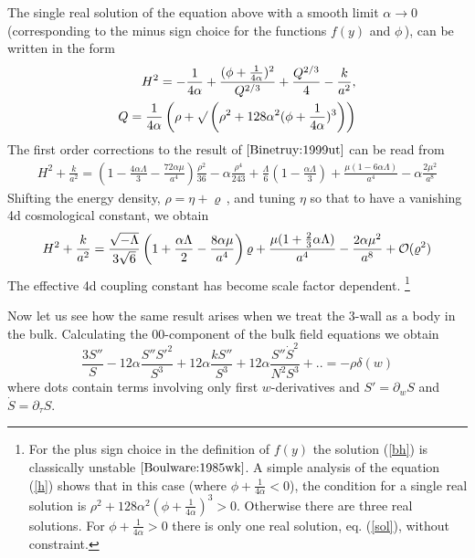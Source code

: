\documentclass[a4paper,a4paper]{article}
\begin{document}
The single real solution of the equation above 
with a smooth limit $\alpha \to 0$
(corresponding to
the minus sign choice for the functions $f(y)$ and $\phi$\,),
can be written in the form
\begin{eqnarray} \label{sol}
H^2= -\frac{1}{4 \alpha} + \frac{(\phi+ \frac{1}{4 \alpha})^2}{Q^{2/3}}+ \frac{Q^{2/3}}{4}-\frac{k}{a^2}, \\
Q=\frac{1}{4 \alpha} \left( \rho+ \surd \left( \rho^2+ 128 \alpha^2 (\phi+ 
\frac{1}{4 \alpha} )^3 \right) \right) \nonumber
\end{eqnarray}
The first order corrections to the result of $\cite{Binetruy:1999ut}$ can be read from
\begin{eqnarray}
H^2+\frac{k}{a^2}=\left(1-\frac{4\alpha\Lambda}{3}-\frac{72\alpha\mu}{a^4} \right) \frac{\rho^2}{36}
-\alpha \frac{\rho^4}{243}
+\frac{\Lambda}{6} \left(1-\frac{\alpha\Lambda}{3} \right) 
+ \frac{\mu(1-6\alpha\Lambda)}{a^4}-\alpha \frac{2\mu^2}{a^8}
\end{eqnarray}
Shifting the energy density, $\rho=\eta+\varrho\,$,  and tuning $\eta$ so that to have 
a vanishing 4d cosmological constant, we obtain
\begin{equation}
H^2+\frac{k}{a^2}=\frac{\sqrt{-\Lambda}}{3 \sqrt{6}} 
\left(1+  \frac{\alpha\Lambda}{2}-\frac{8\alpha \mu}{a^4} \right) \varrho+
\frac{\mu(1+\frac{2}{3} \alpha \Lambda)}{a^4}-\frac{2\alpha\mu^2}{a^8} 
+ {\cal O}(\varrho^2)
\end{equation}
The effective 4d coupling constant has become scale factor dependent.
\footnote{For the plus sign choice in the definition of $f(y)$ the solution (\ref{bh})
is classically unstable $\cite{Boulware:1985wk}$. A simple analysis of the equation (\ref{h})
shows that in this case (where $\phi+ \frac{1}{4\alpha}<0$), the condition for a single real
solution is $\rho^2+ 128 \alpha^2 (\phi+ 
\frac{1}{4 \alpha} )^3>0$. Otherwise there are three real solutions.
 For $\phi+\frac{1}{4\alpha}>0$
there is only one real solution, eq. (\ref{sol}), without constraint.}

Now let us see how the same result arises when we treat the 3-wall as a body in the bulk. Calculating the
00-component of the bulk field equations we obtain
\begin{equation}
\frac{3S''}{S}-
12 \alpha \frac{ S'' {S'}^2}{S^3}+ 12 \alpha  \frac{k S''}{S^3}+
12 \alpha \frac{ S'' \dot S^2}{N^2S^3}+..=- \rho \delta(w)
\end{equation}
where dots contain terms involving only first 
$w$-derivatives and $S'=\partial_w S$ and $\dot S=\partial_{\tau} S$. 
\end{document}
